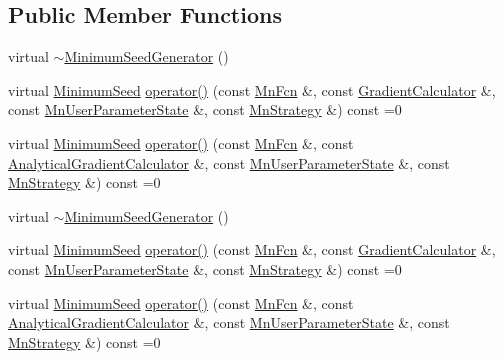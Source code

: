 \subsection*{Public Member Functions}
\begin{DoxyCompactItemize}
\item 
virtual \mbox{\hyperlink{classROOT_1_1Minuit2_1_1MinimumSeedGenerator_a8dba99d17a2ee712dfd6d602c80ec423}{$\sim$\+Minimum\+Seed\+Generator}} ()
\item 
virtual \mbox{\hyperlink{classROOT_1_1Minuit2_1_1MinimumSeed}{Minimum\+Seed}} \mbox{\hyperlink{classROOT_1_1Minuit2_1_1MinimumSeedGenerator_ae71de52027d3f0c7fa202c7cf65b947a}{operator()}} (const \mbox{\hyperlink{classROOT_1_1Minuit2_1_1MnFcn}{Mn\+Fcn}} \&, const \mbox{\hyperlink{classROOT_1_1Minuit2_1_1GradientCalculator}{Gradient\+Calculator}} \&, const \mbox{\hyperlink{classROOT_1_1Minuit2_1_1MnUserParameterState}{Mn\+User\+Parameter\+State}} \&, const \mbox{\hyperlink{classROOT_1_1Minuit2_1_1MnStrategy}{Mn\+Strategy}} \&) const =0
\item 
virtual \mbox{\hyperlink{classROOT_1_1Minuit2_1_1MinimumSeed}{Minimum\+Seed}} \mbox{\hyperlink{classROOT_1_1Minuit2_1_1MinimumSeedGenerator_a670b9671c73d7e0d3caa148e82d4b2fa}{operator()}} (const \mbox{\hyperlink{classROOT_1_1Minuit2_1_1MnFcn}{Mn\+Fcn}} \&, const \mbox{\hyperlink{classROOT_1_1Minuit2_1_1AnalyticalGradientCalculator}{Analytical\+Gradient\+Calculator}} \&, const \mbox{\hyperlink{classROOT_1_1Minuit2_1_1MnUserParameterState}{Mn\+User\+Parameter\+State}} \&, const \mbox{\hyperlink{classROOT_1_1Minuit2_1_1MnStrategy}{Mn\+Strategy}} \&) const =0
\item 
virtual \mbox{\hyperlink{classROOT_1_1Minuit2_1_1MinimumSeedGenerator_a8dba99d17a2ee712dfd6d602c80ec423}{$\sim$\+Minimum\+Seed\+Generator}} ()
\item 
virtual \mbox{\hyperlink{classROOT_1_1Minuit2_1_1MinimumSeed}{Minimum\+Seed}} \mbox{\hyperlink{classROOT_1_1Minuit2_1_1MinimumSeedGenerator_ae71de52027d3f0c7fa202c7cf65b947a}{operator()}} (const \mbox{\hyperlink{classROOT_1_1Minuit2_1_1MnFcn}{Mn\+Fcn}} \&, const \mbox{\hyperlink{classROOT_1_1Minuit2_1_1GradientCalculator}{Gradient\+Calculator}} \&, const \mbox{\hyperlink{classROOT_1_1Minuit2_1_1MnUserParameterState}{Mn\+User\+Parameter\+State}} \&, const \mbox{\hyperlink{classROOT_1_1Minuit2_1_1MnStrategy}{Mn\+Strategy}} \&) const =0
\item 
virtual \mbox{\hyperlink{classROOT_1_1Minuit2_1_1MinimumSeed}{Minimum\+Seed}} \mbox{\hyperlink{classROOT_1_1Minuit2_1_1MinimumSeedGenerator_a670b9671c73d7e0d3caa148e82d4b2fa}{operator()}} (const \mbox{\hyperlink{classROOT_1_1Minuit2_1_1MnFcn}{Mn\+Fcn}} \&, const \mbox{\hyperlink{classROOT_1_1Minuit2_1_1AnalyticalGradientCalculator}{Analytical\+Gradient\+Calculator}} \&, const \mbox{\hyperlink{classROOT_1_1Minuit2_1_1MnUserParameterState}{Mn\+User\+Parameter\+State}} \&, const \mbox{\hyperlink{classROOT_1_1Minuit2_1_1MnStrategy}{Mn\+Strategy}} \&) const =0
\end{DoxyCompactItemize}


